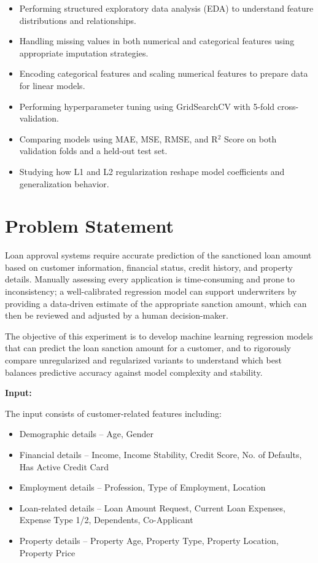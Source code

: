 \documentclass[12pt,a4paper]{article}
\begin{document}
\begin{itemize}
\item Performing structured exploratory data analysis (EDA) to understand feature distributions and relationships.
\item Handling missing values in both numerical and categorical features using appropriate imputation strategies.
\item Encoding categorical features and scaling numerical features to prepare data for linear models.
\item Performing hyperparameter tuning using GridSearchCV with 5-fold cross-validation.
\item Comparing models using MAE, MSE, RMSE, and R$^2$ Score on both validation folds and a held-out test set.
\item Studying how L1 and L2 regularization reshape model coefficients and generalization behavior.
\end{itemize}

\section{Problem Statement}

Loan approval systems require accurate prediction of the sanctioned loan amount based on customer information, financial status, credit history, and property details. Manually assessing every application is time-consuming and prone to inconsistency; a well-calibrated regression model can support underwriters by providing a data-driven estimate of the appropriate sanction amount, which can then be reviewed and adjusted by a human decision-maker.

The objective of this experiment is to develop machine learning regression models that can predict the loan sanction amount for a customer, and to rigorously compare unregularized and regularized variants to understand which best balances predictive accuracy against model complexity and stability.

\textbf{Input:}

The input consists of customer-related features including:
\begin{itemize}
\item Demographic details -- Age, Gender
\item Financial details -- Income, Income Stability, Credit Score, No. of Defaults, Has Active Credit Card
\item Employment details -- Profession, Type of Employment, Location
\item Loan-related details -- Loan Amount Request, Current Loan Expenses, Expense Type 1/2, Dependents, Co-Applicant
\item Property details -- Property Age, Property Type, Property Location, Property Price
\end{itemize}
\end{document}
